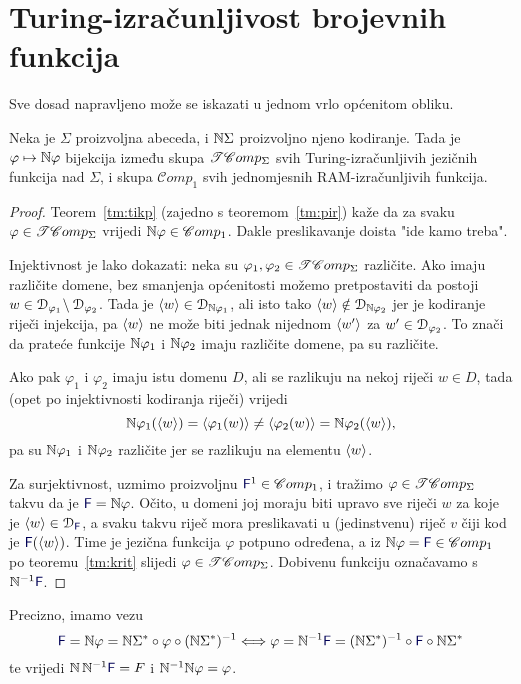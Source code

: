 \section{Turing-izračunljivost brojevnih funkcija}


Sve dosad napravljeno može se iskazati u jednom vrlo općenitom obliku.

\begin{propozicija}[{name=[izomorfizam skupova $\TComp$ i $\mathscr Comp_1$]}]\label{pp:trackbij}
Neka je $\Sigma$ proizvoljna abeceda, i ${\mathbb N}\Sigma$ proizvoljno njeno kodiranje. Tada je $\varphi\mapsto{\mathbb N}\varphi$ bijekcija između skupa $\TComp$ svih Turing-izračunljivih jezičnih funkcija nad $\Sigma$, i skupa $\mathscr Comp_1$ svih jednomjesnih RAM-izračunljivih funkcija.
\end{propozicija}

\begin{proof}
Teorem~\ref{tm:tikp} (zajedno s teoremom~\ref{tm:pir}) kaže da za svaku $\varphi\in\mathscr{TC}omp_\Sigma$ vrijedi ${\mathbb N}\varphi\in\mathscr Comp_1$. Dakle preslikavanje doista "ide kamo treba".

Injektivnost je lako dokazati: neka su $\varphi_1,\varphi_2\in\mathscr{TC}omp_\Sigma$ različite. Ako imaju različite domene, bez smanjenja općenitosti možemo pretpostaviti da postoji $w\in\mathcal D_{\varphi_1}\!\setminus\mathcal D_{\varphi_2}$. Tada je $\langle w\rangle\in\mathcal D_{{\mathbb N}\varphi_1}$, ali isto tako $\langle w\rangle\notin\mathcal D_{{\mathbb N}\varphi_2}$ jer je kodiranje riječi injekcija, pa $\langle w\rangle$ ne može biti jednak nijednom $\langle w'\rangle$ za $w'\in\mathcal D_{\varphi_2}$. To znači da prateće funkcije ${\mathbb N}\varphi_1$ i ${\mathbb N}\varphi_2$ imaju različite domene, pa su različite.

Ako pak $\varphi_1$ i $\varphi_2$ imaju istu domenu $D$, ali se razlikuju na nekoj riječi $w\in D$, tada (opet po injektivnosti kodiranja riječi) vrijedi
\begin{equation}
    {\mathbb N}\varphi_1(\langle w\rangle)=\langle\varphi_1(w)\rangle\ne\langle\varphi_2(w)\rangle={\mathbb N}\varphi_2(\langle w\rangle)\text,
\end{equation}
pa su ${\mathbb N}\varphi_1$ i ${\mathbb N}\varphi_2$ različite jer se razlikuju na elementu $\langle w\rangle$.

Za surjektivnost, uzmimo proizvoljnu $\f F^1\in\mathscr Comp_1$, i tražimo $\varphi\in\mathscr{TC}omp_\Sigma$ takvu da je $\f F=\N\varphi$. Očito, u domeni joj moraju biti upravo sve riječi $w$ za koje je $\kr w\in\dom{\f F}$, a svaku takvu riječ mora preslikavati u (jedinstvenu) riječ $v$ čiji kod je $\f F(\kr w)$. Time je jezična funkcija $\varphi$ potpuno određena, a iz $\N\varphi=\f F\in\mathscr Comp_1$ po teoremu~\ref{tm:krit} slijedi $\varphi\in\mathscr{TC}omp_\Sigma$. Dobivenu funkciju označavamo s $\N^{-1}\f F$.
\end{proof}
Precizno, imamo vezu
\begin{equation}
\f F=\N\varphi=\N\Sigma^*\circ\varphi\circ(\N\Sigma^*)^{-1}\Longleftrightarrow
\varphi=\N^{-1}\f F=(\N\Sigma^*)^{-1}\circ\f F\circ\N\Sigma^*
\end{equation}
te vrijedi $\N\,\N^{-1}\f F=F$ i ${\mathbb N}^{-1}{\mathbb N}\varphi=\varphi$.

